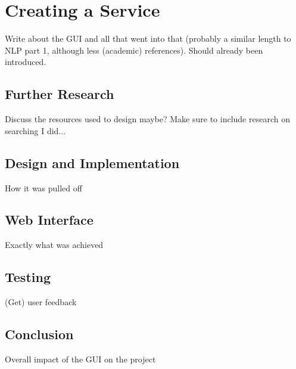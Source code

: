 \section{Creating a Service}
Write about the GUI and all that went into that (probably a similar length to NLP part 1, although less (academic) references). Should already been introduced.
\subsection{Further Research}
Discuss the resources used to design maybe?
Make sure to include research on searching I did...
\subsection{Design and Implementation}
How it was pulled off
\subsection{Web Interface}
Exactly what was achieved
\subsection{Testing}
(Get) user feedback
\subsection{Conclusion}
Overall impact of the GUI on the project
